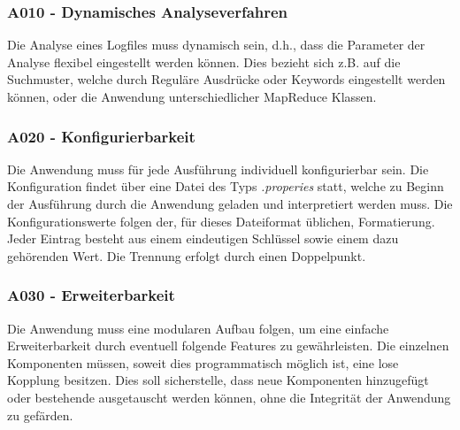 \subsubsection{A010 - Dynamisches Analyseverfahren}\label{subsubsec:A010}
Die Analyse eines Logfiles muss dynamisch sein, d.h., dass die Parameter der Analyse flexibel eingestellt werden können. Dies bezieht sich z.B. auf die Suchmuster, welche durch Reguläre Ausdrücke oder Keywords eingestellt werden können, oder die Anwendung unterschiedlicher MapReduce Klassen.

\subsubsection{A020 - Konfigurierbarkeit}\label{subsubsec:A020}
Die Anwendung muss für jede  Ausführung individuell konfigurierbar sein. Die Konfiguration findet über eine Datei des Typs \textit{.properies} statt, welche zu Beginn der Ausführung durch die Anwendung geladen und interpretiert werden muss. Die Konfigurationswerte folgen der, für dieses Dateiformat üblichen, Formatierung. Jeder Eintrag besteht aus einem eindeutigen Schlüssel sowie einem dazu gehörenden Wert. Die Trennung erfolgt durch einen Doppelpunkt.

\subsubsection{A030 - Erweiterbarkeit}\label{subsubsec:A030}
Die Anwendung muss eine modularen Aufbau folgen, um eine einfache Erweiterbarkeit durch eventuell folgende Features zu gewährleisten. Die einzelnen Komponenten müssen, soweit dies programmatisch möglich ist, eine lose Kopplung besitzen. Dies soll sicherstelle, dass neue Komponenten hinzugefügt oder bestehende ausgetauscht werden können, ohne die Integrität der Anwendung zu gefärden.

